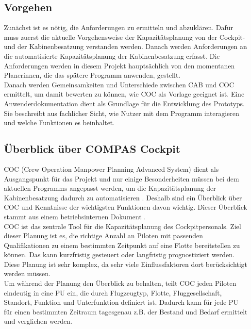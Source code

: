 \documentclass [12pt, a4paper, oneside, titlepage, ngerman]{article}
\begin{document}
\subsection {Vorgehen}
Zunächst ist es nötig, die Anforderungen zu ermitteln und abzuklären. Dafür muss zuerst die aktuelle Vorgehensweise der Kapazitätsplanung von der Cockpit- und der Kabinenbesatzung verstanden werden. Danach werden Anforderungen an die automatisierte Kapazitätsplanung der Kabinenbesatzung erfasst. Die Anforderungen werden in diesem Projekt hauptsächlich von den momentanen Planerinnen, die das spätere Programm anwenden, gestellt. \\
Danach werden Gemeinsamkeiten und Unterschiede zwischen \ac{CAB} und \ac{COC} ermittelt, um damit bewerten zu können, wie \ac{COC} als Vorlage geeignet ist. %
Eine Anwenderdokumentation dient als Grundlage für die Entwicklung des Prototyps. Sie beschreibt aus fachlicher Sicht, wie Nutzer mit dem Programm interagieren und welche Funktionen es beinhaltet.

\subsection{Überblick über COMPAS Cockpit}
\ac{COC} (Crew Operation Manpower Planning Advanced System) dient als Ausgangspunkt für das Projekt und nur einige Besonderheiten müssen bei dem aktuellen Programms angepasst werden, um die Kapazitätsplanung der Kabinenbesatzung dadurch zu automatisieren \cite[vgl.][]{Gespraech1}. Deshalb sind ein Überblick über \ac{COC} und Kenntnisse der wichtigsten Funktionen davon wichtig. Dieser Überblick stammt aus einem betriebsinternen Dokument \cite[vgl.][]{compasdoku}. \\
\ac{COC} ist das zentrale Tool für die Kapazitätsplanung des Cockpitpersonals. Ziel dieser Planung ist es, die richtige Anzahl an Piloten mit passenden Qualifikationen zu einem bestimmten Zeitpunkt auf eine Flotte bereitstellen zu können. Das kann kurzfristig gesteuert oder langfristig prognostiziert werden. Diese Planung ist sehr komplex, da sehr viele Einflussfaktoren dort berücksichtigt werden müssen. \\
Um während der Planung den Überblick zu behalten, teilt \ac{COC} jeden Piloten eindeutig in eine \ac{PU} ein, die durch Flugzeugtyp, Flotte, Fluggesellschaft, Standort, Funktion und Unterfunktion definiert ist. Dadurch kann für jede \ac{PU} für einen bestimmten Zeitraum tagesgenau z.B. der Bestand und Bedarf ermittelt und verglichen werden. \\
\end{document}
